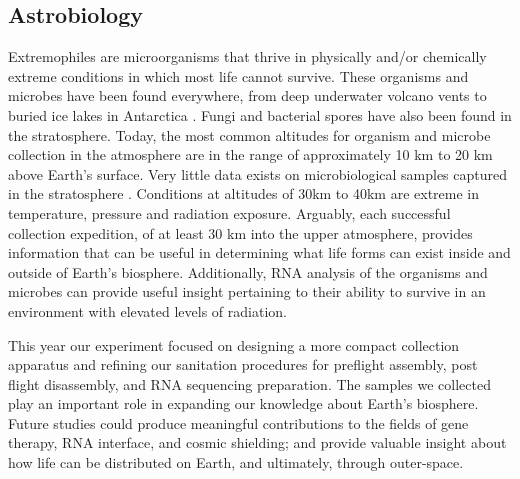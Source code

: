 \subsection{Astrobiology}
\label{sec:Astrobiology-Background}
Extremophiles are microorganisms that thrive in physically and/or chemically extreme conditions in which most life cannot survive. These organisms and microbes have been found everywhere, from deep underwater volcano vents to buried ice lakes in Antarctica \cite{Extremophiles}. Fungi and bacterial spores have also been found in the stratosphere. Today, the most common altitudes for organism and microbe collection in the atmosphere are in the range of approximately 10 km to 20 km above Earth’s surface. Very little data exists on microbiological samples captured in the stratosphere \cite{SORA}. Conditions at altitudes of 30km to 40km are extreme in temperature, pressure and radiation exposure. Arguably, each successful collection expedition, of at least 30 km into the upper atmosphere, provides information that can be useful in determining what life forms can exist inside and outside of Earth’s biosphere. Additionally, RNA analysis of the organisms and microbes can provide useful insight pertaining to their ability to survive in an environment with elevated levels of radiation.  

This year our experiment focused on designing a more compact collection apparatus and refining our sanitation procedures for preflight assembly, post flight disassembly, and RNA sequencing preparation. The samples we collected play an important role in expanding our knowledge about Earth’s biosphere. Future studies could produce meaningful contributions to the fields of gene therapy, RNA interface, and cosmic shielding; and provide valuable insight about how life can be distributed on Earth, and ultimately, through outer-space.

